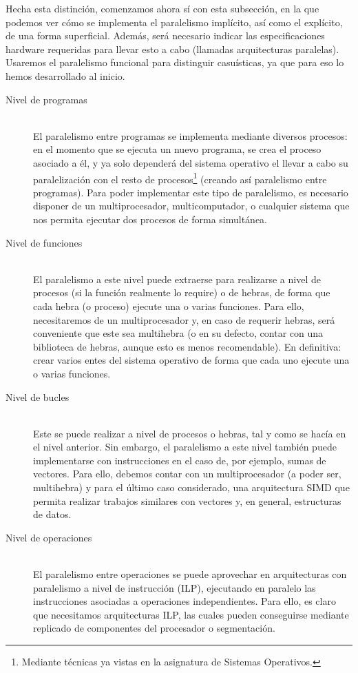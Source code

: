Hecha esta distinción, comenzamos ahora sí con esta subsección, en la que podemos ver cómo se implementa el paralelismo implícito, así como el explícito, de una forma superficial. Además, será necesario indicar las especificaciones hardware requeridas para llevar esto a cabo (llamadas arquitecturas paralelas). Usaremos el paralelismo funcional para distinguir casuísticas, ya que para eso lo hemos desarrollado al inicio.
\begin{description}
    \item [Nivel de programas]~\\
        El paralelismo entre programas se implementa mediante diversos procesos: en el momento que se ejecuta un nuevo programa, se crea el proceso asociado a él, y ya solo dependerá del sistema operativo el llevar a cabo su paralelización con el resto de procesos\footnote{Mediante técnicas ya vistas en la asignatura de Sistemas Operativos.} (creando así paralelismo entre programas). Para poder implementar este tipo de paralelismo, es necesario disponer de un multiprocesador, multicomputador, o cualquier sistema que nos permita ejecutar dos procesos de forma simultánea.

    \item [Nivel de funciones]~\\
        El paralelismo a este nivel puede extraerse para realizarse a nivel de procesos (si la función realmente lo require) o de hebras, de forma que cada hebra (o proceso) ejecute una o varias funciones. Para ello, necesitaremos de un multiprocesador y, en caso de requerir hebras, será conveniente que este sea multihebra (o en su defecto, contar con una biblioteca de hebras, aunque esto es menos recomendable). En definitiva: crear varios entes del sistema operativo de forma que cada uno ejecute una o varias funciones.

    \item [Nivel de bucles]~\\
        Este se puede realizar a nivel de procesos o hebras, tal y como se hacía en el nivel anterior. Sin embargo, el paralelismo a este nivel también puede implementarse con instrucciones en el caso de, por ejemplo, sumas de vectores. Para ello, debemos contar con un multiprocesador (a poder ser, multihebra) y para el último caso considerado, una arquitectura SIMD que permita realizar trabajos similares con vectores y, en general, estructuras de datos.

    \item [Nivel de operaciones]~\\
        El paralelismo entre operaciones se puede aprovechar en arquitecturas con paralelismo a nivel de instrucción (ILP), ejecutando en paralelo las instrucciones asociadas a operaciones independientes. Para ello, es claro que necesitamos arquitecturas ILP, las cuales pueden conseguirse mediante replicado de componentes del procesador o segmentación.
\end{description}

